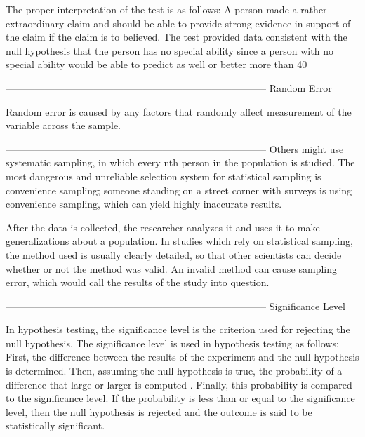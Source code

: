 The proper interpretation of the test is as follows: A person made a rather extraordinary claim and should be able to provide strong evidence in support of the claim if the claim is to believed. The test provided data consistent with the null hypothesis that the person has no special ability since a person with no special ability would be able to predict as well or better more than 40%


--------------------------------------------------------------------------------
Random Error

Random error is caused by any factors that randomly affect measurement of the variable across the sample. 



--------------------------------------------------------------------------------
Others might use systematic sampling, in which every nth person in the population is studied. The most dangerous and unreliable selection system for statistical sampling is convenience sampling; someone standing on a street corner with surveys is using convenience sampling, which can yield highly inaccurate results.


After the data is collected, the researcher analyzes it and uses it to make generalizations about a population. In studies which rely on statistical sampling, the method used is usually clearly detailed, so that other scientists can decide whether or not the method was valid. An invalid method can cause sampling error, which would call the results of the study into question.


--------------------------------------------------------------------------------
Significance Level

In hypothesis testing, the significance level is the criterion used for rejecting the null hypothesis. The significance level is used in hypothesis testing as follows: First, the difference between the results of the experiment and the null hypothesis is determined. Then, assuming the null hypothesis is true, the probability of a difference that large or larger is computed . Finally, this probability is compared to the significance level. If the probability is less than or equal to the significance level, then the null hypothesis is rejected and the outcome is said to be statistically significant. 


